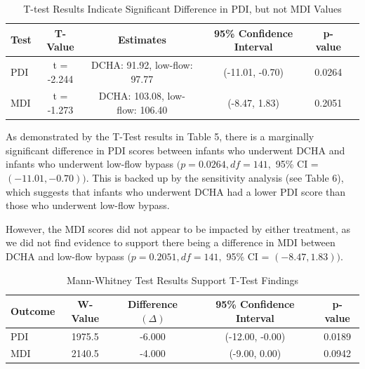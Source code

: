 \documentclass{article}
\begin{document}
\begin{enumerate}
		\begin{table}[h!]
			\centering
			\footnotesize
			\caption{T-test Results Indicate Significant Difference in PDI, but not MDI Values}
			\label{tab:t_test_results}
			\begin{tabular}{lccccc}
				\toprule
				\textbf{Test}   & \textbf{T-Value}  & \textbf{Estimates}           & \textbf{95\% Confidence Interval} & \textbf{p-value} \\
				\midrule
				PDI             & t = -2.244            & DCHA: 91.92, low-flow: 97.77 & (-11.01, -0.70)                  & 0.0264          \\
				MDI             & t = -1.273            & DCHA: 103.08, low-flow: 106.40 & (-8.47, 1.83)                    & 0.2051          \\
				\bottomrule
			\end{tabular}
		\end{table}

		As demonstrated by the T-Test results in Table 5, there is a marginally significant difference in PDI scores between infants who underwent DCHA and infants who underwent low-flow bypass $(p = 0.0264, df = 141,$ 95\% CI = $(-11.01, -0.70))$. This is backed up by the sensitivity analysis (see Table 6), which suggests that infants who underwent DCHA had a lower PDI score than those who underwent low-flow bypass. 

		However, the MDI scores did not appear to be impacted by either treatment, as we did not find evidence to support there being a difference in MDI between DCHA and low-flow bypass $(p = 0.2051, df = 141,$ 95\% CI = $(-8.47, 1.83))$.


		\begin{table}[h!]
			\centering
			\footnotesize
			\caption{Mann-Whitney Test Results Support T-Test Findings}
			\label{tab:mann_whitney_results}
			\begin{tabular}{lcccc}
			\toprule
			\textbf{Outcome} & \textbf{W-Value} & \textbf{Difference $(\Delta)$} & \textbf{95\% Confidence Interval} & \textbf{p-value} \\
			\midrule
			PDI              & 1975.5              & -6.000                  & (-12.00, -0.00)                & 0.0189            \\
			MDI              & 2140.5              & -4.000                  & (-9.00, 0.00)                 & 0.0942           \\
			\bottomrule
			\end{tabular}
		\end{table}




\end{enumerate}
\end{document}
